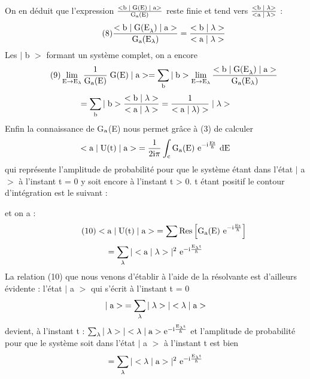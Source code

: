 On en déduit que l'expression $\frac{<\text{b}\;|\;\text{G(E)}\;|\;\text{a}>}{\text{G}_{\text{a}}(\text{E})}$
reste finie et tend vers $\frac{<\text{b}\;|\;\lambda>}{<\text{a}\;|\;\lambda>}$ :
\[
\tag{8}\frac{<\text{b}\;|\;\text{G(E}_\lambda)\;|\;\text{a}>}{\text{G}_{\text{a}}(\text{E}_\lambda)}=
\frac{<\text{b}\;|\;\lambda>}{<\text{a}\;|\;\lambda>}
\]
Les $|$ b $>$ formant un système complet, on a encore
\[
\tag{9}\lim_{\text{E}\to\text{E}_\lambda}\frac{1}{\text{G}_{\text{a}}(\text{E})}\;\text{G(E)}\;|\;\text{a}>=
\sum_{\text{b}}|\;\text{b}>\lim_{\text{E}\to\text{E}_\lambda}
\frac{<\text{b}\;|\;\text{G(E}_\lambda)\;|\;\text{a}>}{\text{G}_{\text{a}}(\text{E}_\lambda)}
\]
\[
=\sum_{\text{b}}|\;\text{b}>\frac{<\text{b}\;|\;\lambda>}{<\text{a}\;|\;\lambda>}=
\frac{1}{<\text{a}\;|\;\lambda)>}\;|\;\lambda>
\]
Enfin la connaissance de G$_{\text{a}}$(E) nous permet grâce à (3) de calculer
\[
<\text{a}\;|\;\text{U(t)}\;|\;\text{a}>\;=\frac{1}{2\text{i}\pi}\int_{\text{c}}\text{G}_{\text{a}}
\text{(E) e}^{-\text{i}\frac{\text{Et}}{\hbar}}\text{ dE}
\]
qui représente l'amplitude de probabilité pour que le système étant dans l'état $|$ a $>$
à l'instant t = 0 y soit encore à l'instant t > 0. t étant positif le contour d'intégration est le suivant :
\begin{center}
\end{center}
et on a :
\[
\tag{10}<\text{a}\;|\;\text{U(t)}\;|\;\text{a}>\;=\sum\text{Res}\left[\text{G}_{\text{a}}\text{(E) e}^{-\text{i}
\frac{\text{Et}}{\hbar}}\right]
\]
\[
=\sum_\lambda|<\text{a}\;|\;\lambda>|^2\text{ e}^{-\text{i}\frac{\text{E}_\lambda\text{t}}{\hbar}}
\]
La relation (10) que nous venons d'établir à l'aide de la résolvante est d'ailleurs
évidente : l'état $|$ a $>$ qui s'écrit à l'instant t = 0
\[
|\;\text{a}>\;=\sum_\lambda|\;\lambda>|<\lambda\;|\;\text{a}>
\]
devient, à l'instant t : $\sum_\lambda|\;\lambda>|<\lambda\;|\;\text{a}>\text{e}^{-\text{i}\frac{\text{E}_\lambda\text{t}}{\hbar}}$
et l'amplitude de probabilité pour que le système soit dans l'état $|$ a $>$ à l'instant t est bien
\[
=\sum_\lambda|<\lambda\;|\;\text{a}>|^2\text{ e}^{-\text{i}\frac{\text{E}_\lambda\text{t}}{\hbar}}
\]
